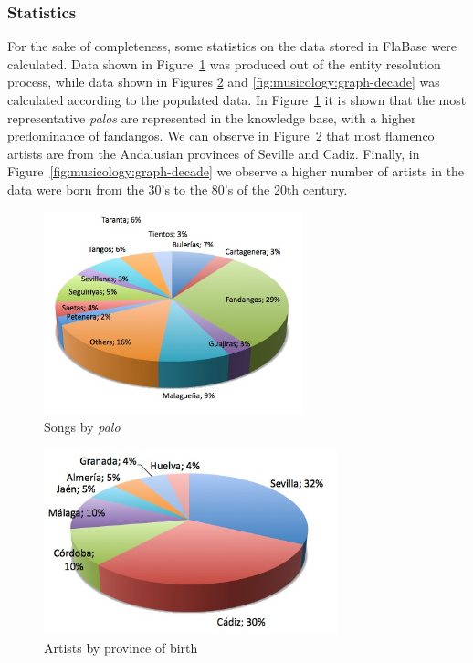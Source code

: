 \subsubsection{Statistics}

For the sake of completeness, some statistics on the data stored in FlaBase were calculated. 
 Data shown in Figure~\ref{fig:musicology:graph-palo} was produced out of the entity resolution process, while data shown in Figures \ref{fig:musicology:graph-province} and \ref{fig:musicology:graph-decade} was calculated according to the populated data. In Figure~\ref{fig:musicology:graph-palo} it is shown that the most representative \textit{palos} are represented in the knowledge base, with a higher predominance of fandangos. We can observe in Figure~\ref{fig:musicology:graph-province} that most flamenco artists are from the Andalusian provinces of Seville and Cadiz. 
Finally, in Figure~\ref{fig:musicology:graph-decade} we observe a higher number of artists in the data were born from the 30's to the 80's of the 20th century.


\begin{figure}[!ht]
    \centering
    \includegraphics[width=7.5cm]{ch05_musicology_pics/Songs-by-palo.jpg}
    \caption{Songs by \textit{palo} 
    \label{fig:musicology:graph-palo}}
\end{figure}


\begin{figure}[!ht]
	\centering
	\includegraphics[width=8.5cm]{ch05_musicology_pics/Artists-by-province.jpg}
	\caption{Artists by province of birth 
	\label{fig:musicology:graph-province}}
\end{figure}


